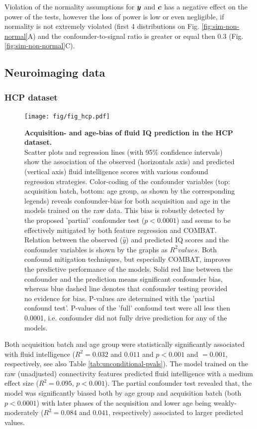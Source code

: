 \documentclass{article}
\begin{document}
Violation of the normality assumptions for $\boldsymbol{y}$ and $\boldsymbol{c}$ has a negative effect on the power of the tests, however the loss of power is low or even negligible, if normality is not extremely violated (first 4 distributions on Fig. \ref{fig:sim-non-normal}A) and the confounder-to-signal ratio is greater or equal then 0.3 (Fig. \ref{fig:sim-non-normal}C).

\subsection{Neuroimaging data}
\subsubsection*{HCP dataset}

\begin{figure}[!b]
  \centering
  \texttt{[image: fig/fig\_hcp.pdf]}
  \caption{\textbf{Acquisition- and age-bias of fluid IQ prediction in the HCP dataset.} \\
  Scatter plots and regression lines (with 95\% confidence intervals) show the association of the observed (horizontals axis) and predicted (vertical axis) fluid intelligence scores with various confound regression strategies. Color-coding of the confounder variables (top: acquisition batch, bottom: age group, as shown by the corresponding legends) reveals confounder-bias for both acquisition and age in the models trained on the raw data. This bias is robustly detected by the proposed 'partial' confounder test ($p<0.0001$) and seems to be effectively mitigated by both feature regression and COMBAT.
  Relation between the observed ($\hat{y}$) and predicted IQ scores and the confounder variables is shown by the graphs as $R^2 values$. Both confound mitigation techniques, but especially COMBAT, improves the predictive performance of the models.
  Solid red line between the confounder and the prediction means significant confounder bias, whereas blue dashed line denotes that confounder testing provided no evidence for bias. P-values are determined with the 'partial confound test'. P-values of the 'full' confound test were all less then 0.0001, i.e. confounder did not fully drive prediction for any of the models.
  }
  \label{fig:hcp}
\end{figure}

Both acquisition batch and age group were statistically significantly associated with fluid intelligence ($R^2=0.032$ and $0.011$ and $p<0.001$ and $=0.001$, respectively, see also Table \ref{tab:unconditional-pvals}). The model trained on the raw (unadjusted) connectivity features predicted fluid intelligence with a medium effect size ($R^2=0.095$, $p<0.001$).
The partial confounder test revealed that, the model was significantly biased both by age group and acquisition batch (both $p<0.0001$) with later phases of the acquisition and lower age being weakly-moderately ($R^2=0.084$ and $0.041$, respectively) associated to larger predicted values.
\end{document}
